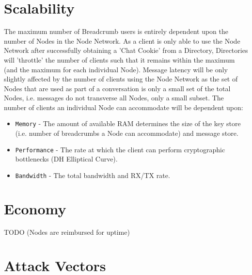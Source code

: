 \documentclass{article}
\begin{document}
\section{Scalability}
The maximum number of Breadcrumb users is entirely dependent upon the number of Nodes in the Node Network. As a client is only able to use the Node Network after successfully obtaining a 'Chat Cookie' from a Directory, Directories will 'throttle' the number of clients such that it remains within the maximum (and the maximum for each individual Node). Message latency will be only slightly affected by the number of clients using the Node Network as the set of Nodes that are used as part of a conversation is only a small set of the total Nodes, i.e. messages do not transverse all Nodes, only a small subset.
The number of clients an individual Node can accommodate will be dependent upon:
\begin{itemize}
	\item \texttt{Memory} - The amount of available RAM determines the size of the key store (i.e. number of breadcrumbs a Node can accommodate) and message store.
	\item \texttt{Performance} - The rate at which the client can perform cryptographic bottlenecks (DH Elliptical Curve).
	\item \texttt{Bandwidth} - The total bandwidth and RX/TX rate.
\end{itemize}

\section{Economy}
TODO (Nodes are reimbursed for uptime)

\newpage

\section{Attack Vectors}
\end{document}
